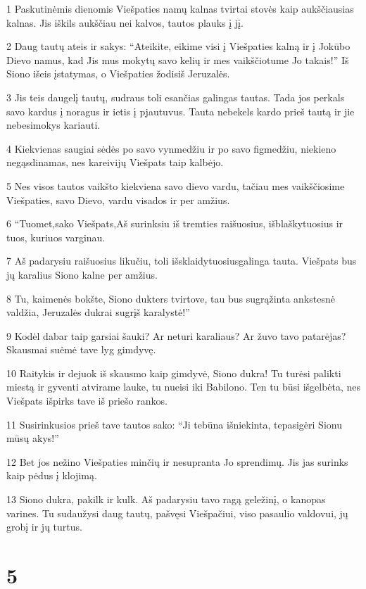 \par 1 Paskutinėmis dienomis Viešpaties namų kalnas tvirtai stovės kaip aukščiausias kalnas. Jis iškils aukščiau nei kalvos, tautos plauks į jį. 
\par 2 Daug tautų ateis ir sakys: “Ateikite, eikime visi į Viešpaties kalną ir į Jokūbo Dievo namus, kad Jis mus mokytų savo kelių ir mes vaikščiotume Jo takais!” Iš Siono išeis įstatymas, o Viešpaties žodis­iš Jeruzalės. 
\par 3 Jis teis daugelį tautų, sudraus toli esančias galingas tautas. Tada jos perkals savo kardus į noragus ir ietis į pjautuvus. Tauta nebekels kardo prieš tautą ir jie nebesimokys kariauti. 
\par 4 Kiekvienas saugiai sėdės po savo vynmedžiu ir po savo figmedžiu, niekieno negąsdinamas, nes kareivijų Viešpats taip kalbėjo. 
\par 5 Nes visos tautos vaikšto kiekviena savo dievo vardu, tačiau mes vaikščiosime Viešpaties, savo Dievo, vardu visados ir per amžius. 
\par 6 “Tuomet,­sako Viešpats,­Aš surinksiu iš tremties raišuosius, išblaškytuosius ir tuos, kuriuos varginau. 
\par 7 Aš padarysiu raišuosius likučiu, toli išsklaidytuosius­galinga tauta. Viešpats bus jų karalius Siono kalne per amžius. 
\par 8 Tu, kaimenės bokšte, Siono dukters tvirtove, tau bus sugrąžinta ankstesnė valdžia, Jeruzalės dukrai sugrįš karalystė!” 
\par 9 Kodėl dabar taip garsiai šauki? Ar neturi karaliaus? Ar žuvo tavo patarėjas? Skausmai suėmė tave lyg gimdyvę. 
\par 10 Raitykis ir dejuok iš skausmo kaip gimdyvė, Siono dukra! Tu turėsi palikti miestą ir gyventi atvirame lauke, tu nueisi iki Babilono. Ten tu būsi išgelbėta, nes Viešpats išpirks tave iš priešo rankos. 
\par 11 Susirinkusios prieš tave tautos sako: “Ji tebūna išniekinta, tepasigėri Sionu mūsų akys!” 
\par 12 Bet jos nežino Viešpaties minčių ir nesupranta Jo sprendimų. Jis jas surinks kaip pėdus į klojimą. 
\par 13 Siono dukra, pakilk ir kulk. Aš padarysiu tavo ragą geležinį, o kanopas varines. Tu sudaužysi daug tautų, pašvęsi Viešpačiui, viso pasaulio valdovui, jų grobį ir jų turtus.



\chapter{5}


